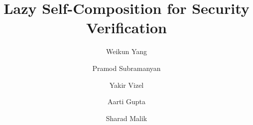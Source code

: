 \documentclass{llncs}       %
\begin{document}

\title{Lazy Self-Composition for Security Verification}

\author{ Weikun Yang \and 
         Pramod Subramanyan \and 
         Yakir Vizel \and
         Aarti Gupta \and 
         Sharad Malik} 


\maketitle

\begin{abstract}
\begin{comment}
We present a novel path-sensitive information flow analysis technique.

Secure information flow analysis is meant to detect if high-security assets can leak during an execution of a program. One approach for performing a precise information flow analysis, is by a reduction to safety verification by means of \emph{self-composition}. However, this reduction is intractable since it requires two copies of the program to be created, on which a safety property is checked. A second, less precise approach, is by using \emph{taint analysis}. Taint analysis provides a sound approximation for secure information flow analysis. While more efficient than self-composition, this approach often results in many ``false'' alarms, i.e. reporting leaks that do not exist.

In order to bridge the gap between the above two approaches, in this paper we present \Ifc, a novel, precise and efficient, secure information flow analysis technique. \Ifc relies on an interplay between a symbolic path-sensitive taint analysis and self-composition, where taint analysis guides self-composition and vice-versa. As a result of this interplay, full self-composition is never required, yet, the overall technique is sound and complete.

We implemented a prototype of \Ifc on top of SeaHorn and evaluated it on challenging examples. The experimental results show the potential of our approach.



We present a novel algorithm for verifying secure information flow that guarantees the absence of information leaks from high-security inputs to low-security outputs in a program. A classic approach for verifying secure information flow is to reduce the problem to safety verification on a \emph{self-composition}, where two copies of the program are created~\cite{BartheCsfw04}.
Although this reduction is sound and complete, it is challenging to perform safety verification in practice, especially on two copies of a program.
Another, less precise approach, is by using \emph{taint analysis} based on an information flow type system. Taint analysis provides a sound approximation for secure information flow. While more scalable than the self-composition approach, it often results in many false alarms, i.e., reporting leaks that do not exist.


\end{comment}
\end{abstract}
\end{document}
